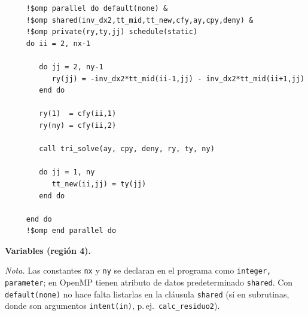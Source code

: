 \documentclass[11pt,a4paper]{article}
\begin{document}
\begin{verbatim}
     !$omp parallel do default(none) &
     !$omp shared(inv_dx2,tt_mid,tt_new,cfy,ay,cpy,deny) &
     !$omp private(ry,ty,jj) schedule(static)
     do ii = 2, nx-1

        do jj = 2, ny-1
           ry(jj) = -inv_dx2*tt_mid(ii-1,jj) - inv_dx2*tt_mid(ii+1,jj)
        end do

        ry(1)  = cfy(ii,1)
        ry(ny) = cfy(ii,2)

        call tri_solve(ay, cpy, deny, ry, ty, ny)

        do jj = 1, ny
           tt_new(ii,jj) = ty(jj)
        end do

     end do
     !$omp end parallel do
\end{verbatim}

\noindent\textbf{Variables (regi\'on 4).}

\medskip

\noindent\textit{Nota.} Las constantes \texttt{nx} y \texttt{ny} se declaran en el
programa como \texttt{integer, parameter}; en OpenMP tienen atributo de datos
predeterminado \texttt{shared}. Con \texttt{default(none)} no hace falta listarlas
en la cl\'ausula \texttt{shared} (s\'i en subrutinas, donde son argumentos
\texttt{intent(in)}, p.\,ej.\ \texttt{calc\_residuo2}).
\end{document}
